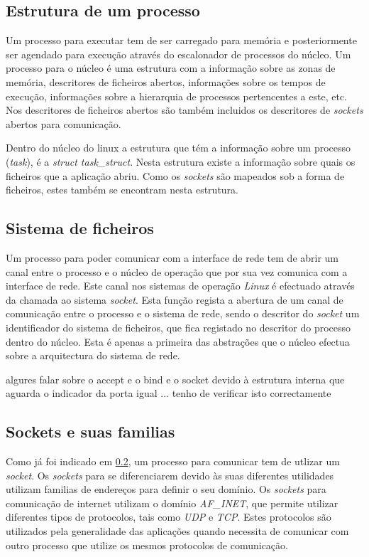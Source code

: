 \subsection{Estrutura de um processo}

Um processo para executar tem de ser carregado para memória e posteriormente ser agendado para execução através do escalonador de processos do núcleo.
 Um processo para o núcleo é uma estrutura com a informação sobre as zonas de memória, descritores de ficheiros abertos, informações sobre os tempos de execução, informações sobre a hierarquia de processos pertencentes a este, etc. Nos descritores de ficheiros abertos são também incluidos os descritores de \textit{sockets} abertos para comunicação. 

 Dentro do núcleo do linux a estrutura que tém a informação sobre um processo (\textit{task}), é a \textit{struct task\_struct}. 
 Nesta estrutura existe a informação sobre quais os ficheiros que a aplicação abriu.
 Como os \textit{sockets} são mapeados sob a forma de ficheiros, estes também se encontram nesta estrutura.

\subsection{Sistema de ficheiros}

Um processo para poder comunicar com a interface de rede tem de abrir um canal entre o processo e o núcleo de operação que por sua vez comunica com a interface de rede.
 Este canal nos sistemas de operação \textit{Linux} é efectuado através da chamada ao sistema \textit{socket}.
 Esta função regista a abertura de um canal de comunicação entre o processo e o sistema de rede, sendo o descritor do \textit{socket} um identificador do sistema de ficheiros, que fica registado no descritor do processo dentro do núcleo.
 Esta é apenas a primeira das abstrações que o núcleo efectua sobre a arquitectura do sistema de rede.
  
algures falar sobre o accept e o bind e o socket devido à estrutura interna que aguarda o indicador da porta igual ... tenho de verificar isto correctamente


\subsection{Sockets e suas familias}
\label{sub:af_inet}

Como já foi indicado em \ref{}, um processo para comunicar tem de utlizar um \textit{socket}.
 Os \textit{sockets} para se diferenciarem devido às suas diferentes utilidades utilizam familias de endereços para definir o seu domínio.
 Os \textit{sockets} para comunicação de internet utilizam o domínio \textit{AF\_INET}, que permite utilizar diferentes tipos de protocolos, tais como \textit{UDP} e \textit{TCP}.
 Estes protocolos são utilizados pela generalidade das aplicações quando necessita de comunicar com outro processo que utilize os mesmos protocolos de comunicação.

